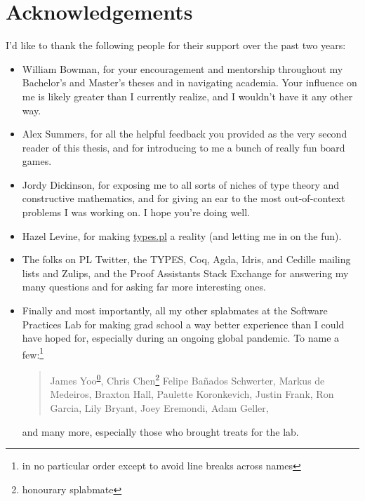 \chapter{Acknowledgements}

I'd like to thank the following people for their support over the past two years:

\begin{itemize}
  \item William Bowman, for your encouragement and mentorship throughout my Bachelor's and Master's theses
    and in navigating academia.
    Your influence on me is likely greater than I currently realize,
    and I wouldn't have it any other way.
  \item Alex Summers, for all the helpful feedback you provided as the very second reader of this thesis,
    and for introducing to me a bunch of really fun board games.
  \item Jordy Dickinson, for exposing me to all sorts of niches of type theory and constructive mathematics,
    and for giving an ear to the most out-of-context problems I was working on.
    I hope you're doing well.
  \item Hazel Levine, for making \href{https://types.pl/}{types.pl} a reality (and letting me in on the fun).
  \item The folks on PL Twitter, the TYPES, Coq, Agda, Idris, and Cedille mailing lists and Zulips,
    and the Proof Assistants Stack Exchange for answering my many questions
    and for asking far more interesting ones.
  \item Finally and most importantly, all my other splabmates at the Software Practices Lab
    for making grad school a way better experience than I could have hoped for,
    especially during an ongoing global pandemic.
    To name a few:\footnote{in no particular order except to avoid line breaks across names}
    \vspace{-0.25\baselineskip}
    \begin{quote}
    James Yoo\textsuperscript{\href{https://youtu.be/dQw4w9WgXcQ}{0}}, Chris Chen\punctstack{,}\footnote{honourary splabmate}
    Felipe Ba\~nados Schwerter, Markus de Medeiros, 
    Braxton Hall, Paulette Koronkevich, Justin Frank, Ron Garcia, Lily Bryant,
    Joey Eremondi, Adam Geller,
    \end{quote}
    \vspace{-0.5\baselineskip}
    and many more, especially those who brought treats for the lab.
\end{itemize}

